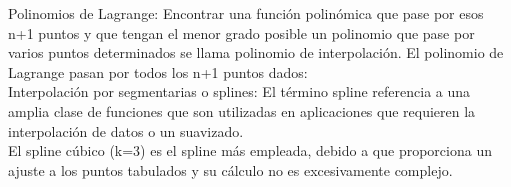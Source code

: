 Polinomios de Lagrange: Encontrar una funci\'on polin\'omica que pase por esos n+1 puntos y que tengan el menor grado posible un polinomio que pase por varios puntos determinados se llama polinomio de interpolaci\'on. El polinomio de Lagrange pasan por todos los n+1 puntos dados:\\

Interpolaci\'on por segmentarias o splines: El t\'ermino spline referencia a una amplia clase de funciones que son utilizadas en aplicaciones que requieren la interpolaci\'on de datos o un suavizado.\\ %
El spline c\'ubico (k=3) es el spline m\'as empleada, debido a que proporciona un ajuste a los puntos tabulados y su c\'alculo no es excesivamente complejo.\\